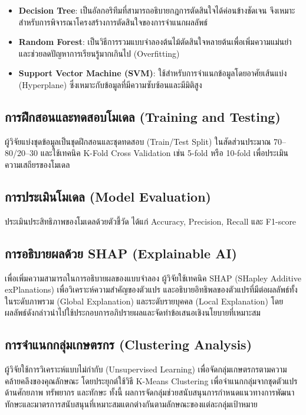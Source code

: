 \begin{itemize}
\item \textbf{Decision Tree}: เป็นอัลกอริทึมที่สามารถอธิบายกฎการตัดสินใจได้ค่อนข้างชัดเจน จึงเหมาะสำหรับการพิจารณาโครงสร้างการตัดสินใจของการจำแนกผลลัพธ์

\item \textbf{Random Forest}: เป็นวิธีการรวมแบบจำลองต้นไม้ตัดสินใจหลายต้นเพื่อเพิ่มความแม่นยำ และช่วยลดปัญหาการเรียนรู้มากเกินไป (Overfitting)

\item \textbf{Support Vector Machine (SVM)}: ใช้สำหรับการจำแนกข้อมูลโดยอาศัยเส้นแบ่ง (Hyperplane) ซึ่งเหมาะกับข้อมูลที่มีความซับซ้อนและมีมิติสูง
\end{itemize}

\subsection{การฝึกสอนและทดสอบโมเดล (Training and Testing)}

ผู้วิจัยแบ่งชุดข้อมูลเป็นชุดฝึกสอนและชุดทดสอบ (Train/Test Split) ในสัดส่วนประมาณ 70--80/20--30 และใช้เทคนิค K-Fold Cross Validation เช่น 5-fold หรือ 10-fold เพื่อประเมินความเสถียรของโมเดล

\subsection{การประเมินโมเดล (Model Evaluation)}

ประเมินประสิทธิภาพของโมเดลด้วยตัวชี้วัด ได้แก่ Accuracy, Precision, Recall และ F1-score

\subsection{การอธิบายผลด้วย SHAP (Explainable AI)}

เพื่อเพิ่มความสามารถในการอธิบายผลของแบบจำลอง ผู้วิจัยใช้เทคนิค SHAP (SHapley Additive exPlanations) เพื่อวิเคราะห์ความสำคัญของตัวแปร และอธิบายอิทธิพลของตัวแปรที่มีต่อผลลัพธ์ทั้งในระดับภาพรวม (Global Explanation) และระดับรายบุคคล (Local Explanation) โดยผลลัพธ์ดังกล่าวนำไปใช้ประกอบการอภิปรายผลและจัดทำข้อเสนอเชิงนโยบายที่เหมาะสม

\subsection{การจำแนกกลุ่มเกษตรกร (Clustering Analysis)}

ผู้วิจัยใช้การวิเคราะห์แบบไม่กำกับ (Unsupervised Learning) เพื่อจัดกลุ่มเกษตรกรตามความคล้ายคลึงของคุณลักษณะ โดยประยุกต์ใช้วิธี K-Means Clustering เพื่อจำแนกกลุ่มจากชุดตัวแปรด้านศักยภาพ ทรัพยากร และทักษะ ทั้งนี้ ผลการจัดกลุ่มช่วยสนับสนุนการกำหนดแนวทางการพัฒนาทักษะและมาตรการสนับสนุนที่เหมาะสมแตกต่างกันตามลักษณะของแต่ละกลุ่มเป้าหมาย
